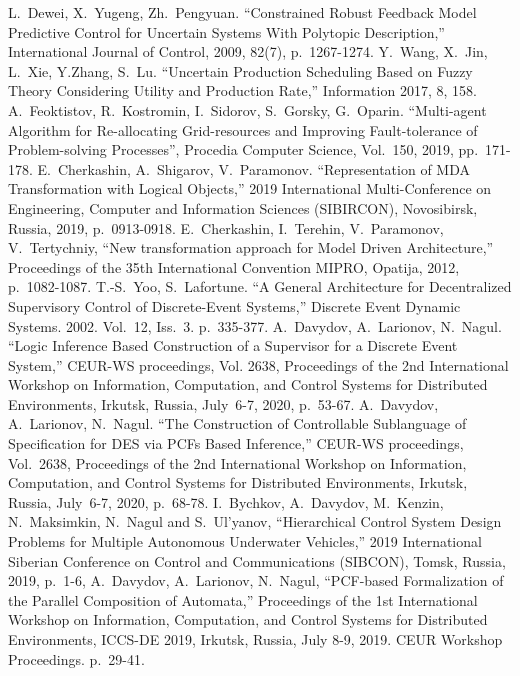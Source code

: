 \documentclass[conference]{IEEEtran}
\begin{document}
\begin{thebibliography}{999}
     L.~Dewei, X.~Yugeng, Zh.~Pengyuan. ``Constrained Robust Feedback Model Predictive Control for Uncertain Systems With Polytopic Description,'' International Journal of Control, 2009, 82(7), p.~1267-1274.
     Y.~Wang, X.~Jin, L.~Xie, Y.Zhang, S.~Lu. ``Uncertain Production Scheduling Based on Fuzzy Theory Considering Utility and Production Rate,'' Information 2017, 8, 158.
     A.~Feoktistov, R.~Kostromin, I.~Sidorov, S.~Gorsky, G.~Oparin. ``Multi-agent Algorithm for Re-allocating Grid-resources and Improving Fault-tolerance of Problem-solving Processes'', Procedia Computer Science, Vol.~150, 2019, pp.~171-178. 
     E.~Cherkashin, A.~Shigarov, V.~Paramonov. ``Representation of MDA Transformation with Logical Objects,'' 2019 International Multi-Conference on Engineering, Computer and Information Sciences (SIBIRCON), Novosibirsk, Russia, 2019, p.~0913-0918. 
     E.~Cherkashin, I.~Terehin, V.~Paramonov, V.~Tertychniy, ``New transformation approach for Model Driven Architecture,'' Proceedings of the 35th International Convention MIPRO, Opatija, 2012, p.~1082-1087.
     T.-S.~Yoo, S.~Lafortune. ``A General Architecture for Decentralized Supervisory Control of Discrete-Event Systems,'' Discrete Event Dynamic Systems. 2002. Vol.~12, Iss.~3. p.~335-377. 
     A.~Davydov, A.~Larionov, N.~Nagul. ``Logic Inference Based Construction of a Supervisor for a Discrete Event System,'' CEUR-WS proceedings, Vol. 2638, Proceedings of the 2nd International Workshop on Information, Computation, and Control Systems for Distributed Environments, Irkutsk, Russia, July~6-7, 2020,  p.~53-67.
     A.~Davydov, A.~Larionov, N.~Nagul. ``The Construction of Controllable Sublanguage of Specification for DES via PCFs Based Inference,'' CEUR-WS proceedings, Vol.~2638, Proceedings of the 2nd International Workshop on Information, Computation, and Control Systems for Distributed Environments, Irkutsk, Russia, July~6-7, 2020, p.~68-78.
     I.~Bychkov, A.~Davydov, M.~Kenzin, N.~Maksimkin, N.~Nagul and S.~Ul’yanov, ``Hierarchical Control System Design Problems for Multiple Autonomous Underwater Vehicles,'' 2019 International Siberian Conference on Control and Communications (SIBCON), Tomsk, Russia, 2019, p.~1-6, 
     A.~Davydov, A.~Larionov, N.~Nagul, ``PCF-based Formalization of the Parallel Composition of Automata,'' Proceedings of the 1st International Workshop on Information, Computation, and Control Systems for Distributed Environments, ICCS-DE 2019, Irkutsk, Russia, July 8-9, 2019. CEUR Workshop Proceedings. p.~29-41.

\end{thebibliography}
\end{document}
